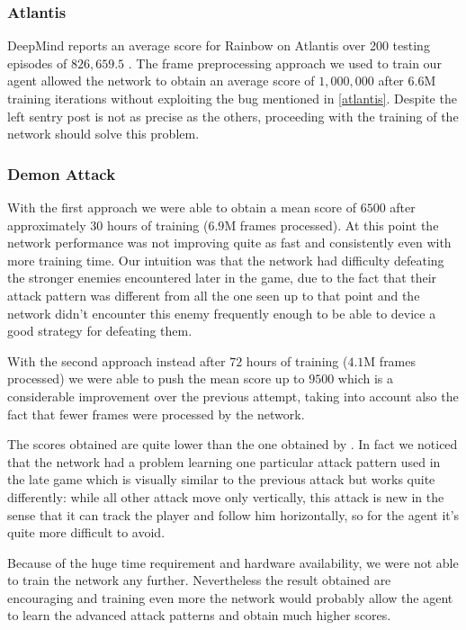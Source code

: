 \documentclass[10pt,twocolumn,letterpaper]{article}
\begin{document}
\subsubsection{Atlantis}
DeepMind reports an average score for Rainbow on Atlantis over 200 testing episodes of $826,659.5$ \cite{DBLP:journals/corr/abs-1710-02298}. The frame preprocessing approach we used to train our agent allowed the network to obtain an average score of $1,000,000$ after $6.6$M training iterations without exploiting the bug mentioned in \ref{atlantis}. Despite the left sentry post is not as precise as the others,  proceeding with the training of the network should solve this problem.

\subsubsection{Demon Attack} 
With the first approach we were able to obtain a mean score of $6500$ after approximately $30$ hours of training ($6.9$M frames processed). At this point the network performance was not improving quite as fast and consistently even with more training time. Our intuition was that the network had difficulty defeating the stronger enemies encountered later in the game, due to the fact that their attack pattern was different from all the one seen up to that point and the network didn't encounter this enemy frequently enough to be able to device a good strategy for defeating them.

With the second approach instead after $72$ hours of training ($4.1$M frames processed) we were able to push the mean score up to $9500$ which is a considerable improvement over the previous attempt, taking into account also the fact that fewer frames were processed by the network.

The scores obtained are quite lower than the one obtained by \cite{DBLP:journals/corr/abs-1710-02298}. In fact we noticed that the network had a problem learning one particular attack pattern used in the late game which is visually similar to the previous attack but works quite differently: while all other attack move only vertically, this attack is new in the sense that it can track the player and follow him horizontally, so for the agent it's quite more difficult to avoid.

Because of the huge time requirement and hardware availability, we were not able to train the network any further. Nevertheless the result obtained are encouraging and training even more the network would probably allow the agent to learn the advanced attack patterns and obtain much higher scores.


{\small


}
\end{document}
